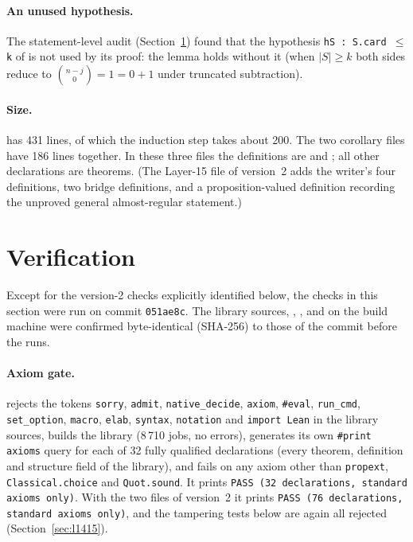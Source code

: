 \documentclass[11pt]{article}
\theoremstyle{definition}
\theoremstyle{remark}
\newcommand{\lean}[1]{\texttt{#1}}
\newcommand{\repo}{https://github.com/jpbald93/baranyai}
\newcommand{\commit}{051ae8c4063be0bb70f1726e9f60d0319dd37d91}
\newcommand{\shortcommit}{051ae8c}
\newcommand{\file}[1]{\href{\repo/blob/\commit/#1}{\path{#1}}}
\begin{document}
\paragraph{An unused hypothesis.} The statement-level audit (Section~\ref{sec:verify}) found that the
hypothesis \lean{hS : S.card }$\le$\lean{ k} of  is not used by its proof: the lemma
holds without it (when $|S|\ge k$ both sides reduce to $\binom{n-j}0=1=0+1$ under truncated
subtraction).

\paragraph{Size.}  has 431 lines, of which the induction step takes about 200. The
two corollary files have 186 lines together. In these three files the definitions are
 and ; all other declarations are theorems. (The Layer-15 file
of version~2 adds the writer's four definitions, two bridge definitions, and a proposition-valued
definition recording the unproved general almost-regular statement.)

\section{Verification}\label{sec:verify}

Except for the version-2 checks explicitly identified below, the checks in this section were run on
commit \texttt{\shortcommit}. The library sources, ,
,  and  on the build machine were confirmed
byte-identical (SHA-256) to those of the commit before the runs.

\paragraph{Axiom gate.} \file{gate.sh} rejects the tokens \lean{sorry}, \lean{admit},
\lean{native\_decide}, \lean{axiom}, \lean{\#eval}, \lean{run\_cmd}, \lean{set\_option}, \lean{macro},
\lean{elab}, \lean{syntax}, \lean{notation} and \lean{import Lean} in the library sources, builds the
library (8\,710 jobs, no errors), generates its own \lean{\#print axioms} query for each of 32 fully
qualified declarations (every theorem, definition and structure field of the library), and fails on
any axiom other than \lean{propext}, \lean{Classical.choice} and \lean{Quot.sound}. It prints
\texttt{PASS (32 declarations, standard axioms only)}. With the two files of version~2 it prints
\texttt{PASS (76 declarations, standard axioms only)}, and the tampering tests below are again all
rejected (Section~\ref{sec:l1415}).
\end{document}

